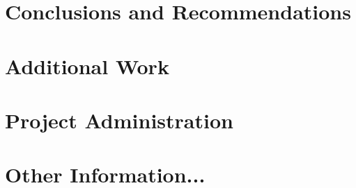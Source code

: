 \documentclass{article}
\begin{document}
\section{Conclusions and Recommendations}


\newpage



\appendix

\newpage

\section{Additional Work}


\newpage

\section{Project Administration}


\section{Other Information...}
	
\end{document}
